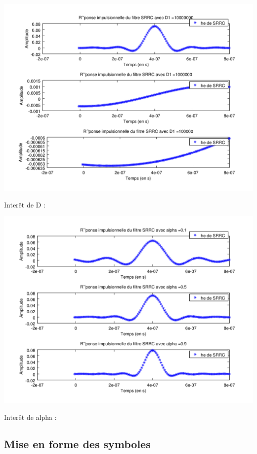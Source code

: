 \documentclass{acm_proc_article-sp}
\begin{document}
\begin{center}
\begin{center}
\begin{center}
\includegraphics[scale=0.45]{SRRC_varD_3.png}

Interêt de D : 

\includegraphics[scale=0.45]{SRRC_varAlpha_3.png}
\end{center}

Interêt de alpha :

\subsection{Mise en forme des symboles}


\end{center}
\end{center}
\end{document}
